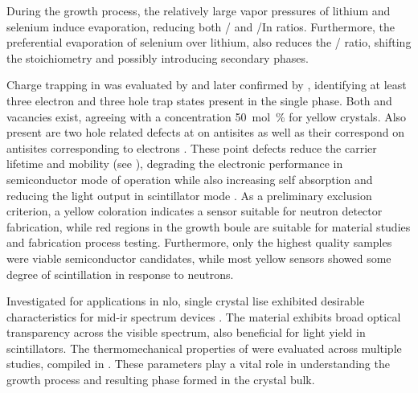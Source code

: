\documentclass[../../../main.tex]{subfiles}
\begin{document}
    During the growth process, the relatively large vapor pressures of lithium and selenium induce evaporation, reducing both / and /{In} ratios.
    Furthermore, the preferential evaporation of selenium over lithium, also reduces the / ratio, shifting the stoichiometry and possibly introducing secondary phases. 
    \par%
    Charge trapping in  was evaluated by \citeauthor*{Cui_2013} and later confirmed by \citeauthor*{Hamm_2018}, identifying at least three electron and three hole trap states present in the single phase.
    Both  and  vacancies exist, agreeing with a  concentration \Xmath{<}\SI{50}{\mol\percent} for yellow crystals.
    Also present are two hole related defects at  on  antisites as well as their correspond  on  antisites corresponding to electrons \cite{Cui_2013, Hamm_2018}.
    These point defects reduce the carrier lifetime and mobility (see ), degrading the electronic performance in semiconductor mode of operation while also increasing self absorption and reducing the light output in scintillator mode \cite{book:Seebauer_2008, Stowe_2014}.
    As a preliminary exclusion criterion, a yellow coloration indicates a sensor suitable for neutron detector fabrication, while red regions in the growth boule are suitable for material studies and fabrication process testing.    
    Furthermore, only the highest quality samples were viable semiconductor candidates, while most yellow sensors showed some degree of scintillation in response to neutrons. 
    \par%
    Investigated for applications in \gls{nlo}, single crystal \gls{lise} exhibited desirable characteristics for \gls{mid-ir} spectrum devices \cite{Garmire_2013,Isaenko_2002}.
    The material exhibits broad optical transparency across the visible spectrum, also beneficial for light yield in scintillators.
    The thermomechanical properties of  were evaluated across multiple studies, compiled in .
    These parameters play a vital role in understanding the growth process and resulting phase formed in the crystal bulk.
\end{document}
